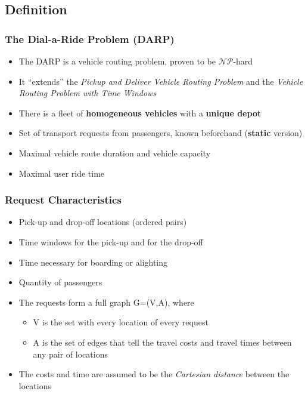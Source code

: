 \documentclass{beamer}
\begin{document}
\subsection{Definition}

\begin{frame}
\frametitle{The Dial-a-Ride Problem (DARP)}
\begin{itemize}
\item The DARP is a vehicle routing problem, proven to be $\mathcal{NP}$-hard
\item It \enquote{extends} the \emph{Pickup and Deliver Vehicle Routing Problem} and the \emph{Vehicle Routing Problem with Time Windows}
\pause
\item There is a fleet of \textbf{homogeneous vehicles} with a \textbf{unique depot}
\item Set of transport requests from passengers, known beforehand (\textbf{static} version)
\item Maximal vehicle route duration and vehicle capacity
\item Maximal user ride time
\end{itemize}
\end{frame}

\begin{frame}
\frametitle{Request Characteristics}
\begin{itemize}
\item Pick-up and drop-off locations (ordered pairs)
\item Time windows for the pick-up and for the drop-off
\item Time necessary for boarding or alighting
\item Quantity of passengers
\pause
\item The requests form a full graph G=(V,A), where
	\begin{itemize}
	\item V is the set with every location of every request
	\item A is the set of edges that tell the travel costs and travel times between any pair of locations
	\end{itemize}
\pause
\item The costs and time are assumed to be the \emph{Cartesian distance} between the locations
\end{itemize}
\end{frame}
\end{document}

